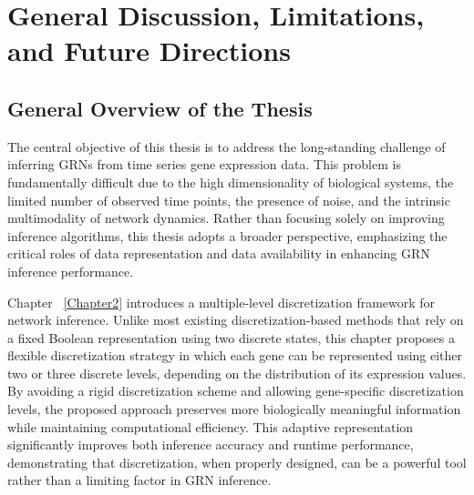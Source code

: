 
\chapter{General Discussion, Limitations, and Future Directions} %

\label{Chapter5} %




\section{General Overview of the Thesis}

The central objective of this thesis is to address the long-standing challenge of inferring GRNs from time series gene expression data. This problem is fundamentally difficult due to the high dimensionality of biological systems, the limited number of observed time points, the presence of noise, and the intrinsic multimodality of network dynamics. Rather than focusing solely on improving inference algorithms, this thesis adopts a broader perspective, emphasizing the critical roles of data representation and data availability in enhancing GRN inference performance.

Chapter ~\ref{Chapter2}  introduces a multiple-level discretization framework for network inference. Unlike most existing discretization-based methods that rely on a fixed Boolean representation using two discrete states, this chapter proposes a flexible discretization strategy in which each gene can be represented using either two or three discrete levels, depending on the distribution of its expression values. By avoiding a rigid discretization scheme and allowing gene-specific discretization levels, the proposed approach preserves more biologically meaningful information while maintaining computational efficiency. This adaptive representation significantly improves both inference accuracy and runtime performance, demonstrating that discretization, when properly designed, can be a powerful tool rather than a limiting factor in GRN inference.

